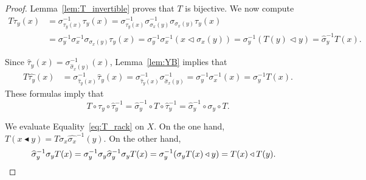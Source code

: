 \begin{proof}
    Lemma~\ref{lem:T_invertible} proves that $T$ is bijective. 
    We now compute 
    \begin{align*}
        T\tau_y(x) &= 
        \sigma^{-1}_{\tau_y(x)}\tau_y(x)
        =\sigma^{-1}_{\tau_y(x)}\sigma^{-1}_{\sigma_x(y)}\sigma_{\sigma_x(y)}\tau_y(x)\\
        &=\sigma^{-1}_y\sigma^{-1}_x\sigma_{\sigma_x(y)}\tau_y(x)
        =\sigma^{-1}_y\sigma_x^{-1}(x\triangleleft\sigma_x(y))
        =\sigma^{-1}_y(T(y)\triangleleft y)
        =\widehat{\sigma}^{-1}_yT(x).
    \end{align*}

    Since $\widehat{\tau}_y(x)=\sigma^{-1}_{\widehat{\sigma}_x(y)}(x)$, Lemma~\ref{lem:YB} implies that 
    \begin{align*}
        T\widehat{\tau_y}(x) 
        &=\sigma^{-1}_{\widehat{\tau}_y(x)}\widehat{\tau}_y(x)
        =\sigma^{-1}_{\widehat{\tau}_y(x)}\sigma^{-1}_{\widehat{\sigma}_x(y)}
        =\sigma^{-1}_{y}\sigma^{-1}_{x}(x)
        =\sigma^{-1}_{y}T(x).
    \end{align*}
    These formulas imply that
    \begin{equation}
        \label{eq:T_rack}
        T\circ\tau_y\circ\widehat{\tau}_y^{-1}
        =\widehat{\sigma}^{-1}_y\circ T\circ \widehat{\tau}^{-1}_y
        =\widehat{\sigma}^{-1}_y\circ \sigma_y\circ T.
    \end{equation}

    We evaluate Equality~\eqref{eq:T_rack} on $X$. On the one hand, 
    $T(x\blacktriangleleft y)=T\sigma_x\widehat{\sigma_x}^{-1}(y)$.
    On the other hand,
    \begin{align*}
        \widehat{\sigma}_y^{-1}\sigma_yT(x)
        &=\sigma_y^{-1}\sigma_y\widehat{\sigma}_y^{-1}\sigma_yT(x)
        =\sigma_y^{-1}(\sigma_yT(x)\triangleleft y)=T(x)\triangleleft T(y).\qedhere
    \end{align*}
\end{proof}



